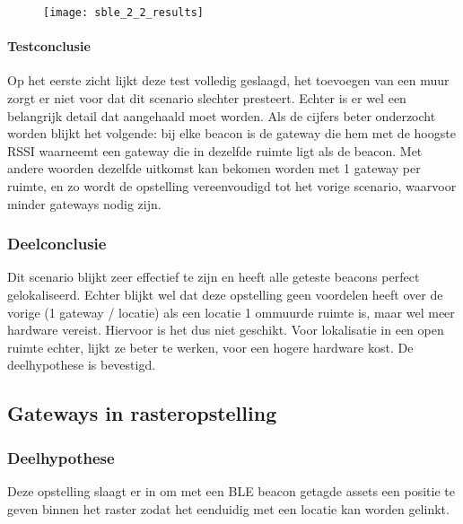 \begin{figure}[h]
	\texttt{[image: sble\_2\_2\_results]}
	\label{fig:ond-ble-static-2-2-res}
\end{figure}

\paragraph{Testconclusie}
Op het eerste zicht lijkt deze test volledig geslaagd, het toevoegen van een muur zorgt er niet voor dat dit scenario slechter presteert. Echter is er wel een belangrijk detail dat aangehaald moet worden. Als de cijfers beter onderzocht worden blijkt het volgende: bij elke beacon is de gateway die hem met de hoogste RSSI waarneemt een gateway die in dezelfde ruimte ligt als de beacon. Met andere woorden dezelfde uitkomst kan bekomen worden met 1 gateway per ruimte, en zo wordt de opstelling vereenvoudigd tot het vorige scenario, waarvoor minder gateways nodig zijn.

\subsubsection{Deelconclusie}
Dit scenario blijkt zeer effectief te zijn en heeft alle geteste beacons perfect gelokaliseerd. Echter blijkt wel dat deze opstelling geen voordelen heeft over de vorige (1 gateway / locatie) als een locatie 1 ommuurde ruimte is, maar wel meer hardware vereist. Hiervoor is het dus niet geschikt. Voor lokalisatie in een open ruimte echter, lijkt ze beter te werken, voor een hogere hardware kost. De deelhypothese is bevestigd.

\subsection{Gateways in rasteropstelling}
\subsubsection{Deelhypothese}
Deze opstelling slaagt er in om met een BLE beacon getagde assets een positie te geven binnen het raster zodat het eenduidig met een locatie kan worden gelinkt.

